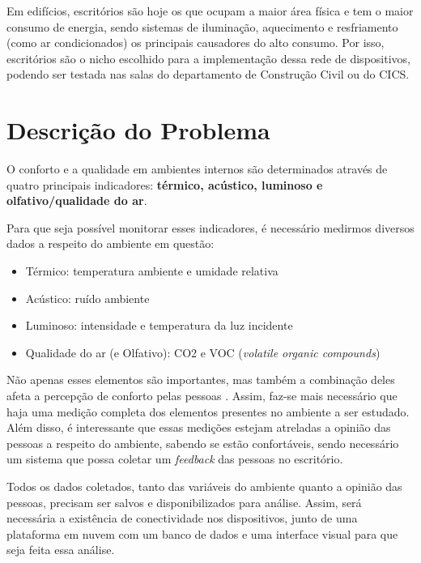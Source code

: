 \documentclass[../monografia.tex]{subfiles}
\begin{document}
Em edifícios, escritórios são hoje os que ocupam a maior área física e tem o maior consumo de energia, sendo sistemas de iluminação, aquecimento e resfriamento (como ar condicionados) os principais causadores do alto consumo\cite{EnergyBuildings}. Por isso, escritórios são o nicho escolhido para a implementação dessa rede de dispositivos, podendo ser testada nas salas do departamento de Construção Civil ou do CICS. 



\section{Descrição do Problema} %

O conforto e a qualidade em ambientes internos são determinados através de quatro principais indicadores: \textbf{térmico, acústico, luminoso e olfativo/qualidade do ar}\cite{ComfortBox}. 

Para que seja possível monitorar esses indicadores, é necessário medirmos diversos dados a respeito do ambiente em questão: %
\begin{itemize}
\item Térmico: temperatura ambiente e umidade relativa
\item Acústico: ruído ambiente
\item Luminoso: intensidade e temperatura da luz incidente
\item Qualidade do ar (e Olfativo): CO2 e VOC (\textit{volatile organic compounds})
\end{itemize}

Não apenas esses elementos são importantes, mas também a combinação deles afeta a percepção de conforto pelas pessoas \cite{ComfortOffice}. Assim, faz-se mais necessário que haja uma medição completa dos elementos presentes no ambiente a ser estudado. Além disso, é interessante que essas medições estejam atreladas a opinião das pessoas a respeito do ambiente, sabendo se estão confortáveis, sendo necessário um sistema que possa coletar um \textit{feedback} das pessoas no escritório. 

Todos os dados coletados, tanto das variáveis do ambiente quanto a opinião das pessoas, precisam ser salvos e disponibilizados para análise. Assim, será necessária a existência de conectividade nos dispositivos, junto de uma plataforma em nuvem com um banco de dados e uma interface visual para que seja feita essa análise. 
\end{document}
